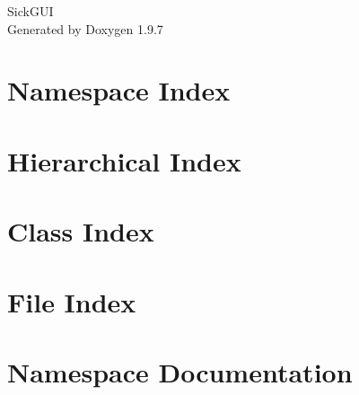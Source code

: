 \documentclass[twoside]{book}
\newcommand{\+}{\discretionary{\mbox{\scriptsize$\hookleftarrow$}}{}{}}
\newcommand{\clearemptydoublepage}{%
    \newpage{\pagestyle{empty}\cleardoublepage}%
  }
\begin{document}
  \raggedbottom
    \hypersetup{pageanchor=false,
                bookmarksnumbered=true,
                pdfencoding=unicode
               }
  \begin{titlepage}
  \vspace*{7cm}
  \begin{center}%
  {\Large Sick\+GUI}\\
  \vspace*{1cm}
  {\large Generated by Doxygen 1.9.7}\\
  \end{center}
  \end{titlepage}
  \clearemptydoublepage
  \tableofcontents
  \clearemptydoublepage
  \hypersetup{pageanchor=true}
\chapter{Namespace Index}

\chapter{Hierarchical Index}

\chapter{Class Index}

\chapter{File Index}

\chapter{Namespace Documentation}



\end{document}
